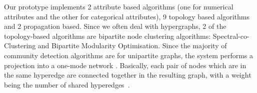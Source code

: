 



Our prototype implements 2 attribute based algorithms (one for numerical attributes and the other for categorical attributes), 9 topology based algorithms and 2 propagation based. Since we often deal with hypergraphs, 2 of the topology-based algorithms are bipartite node clustering algorithms: Spectral-co-Clustering \cite{dhillonCoclusteringDocumentsWords2001} and Bipartite Modularity Optimisation\cite{guimeràModuleIdentificationBipartite2007}. Since the majority of community detection algorithms are for unipartite graphs, the system performs a projection into a one-mode network \cite{zhouBipartiteNetworkProjection2007}. Basically, each pair of nodes which are in the same hyperedge are connected together in the resulting graph, with a weight being the number of shared hyperedges~\cite{guimeràModuleIdentificationBipartite2007}.

